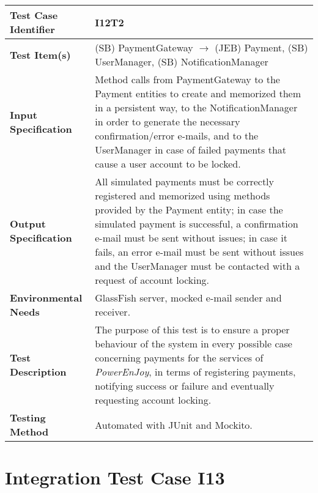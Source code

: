 \begin{longtable}{p{} | p{}}
\hline
\textbf{Test Case Identifier} & I12T2\\
\hline
\textbf{Test Item(s)} & (SB) PaymentGateway $\rightarrow$ (JEB) Payment, (SB) UserManager, (SB) NotificationManager \\
\hline
\textbf{Input Specification} & Method calls from PaymentGateway to the Payment entities to create and memorized them in a persistent way, to the NotificationManager in order to generate the necessary confirmation/error e-mails, and to the UserManager in case of failed payments that cause a user account to be locked. \\
\hline
\textbf{Output Specification} & All simulated payments must be correctly registered and memorized using methods provided by the Payment entity; in case the simulated payment is successful, a confirmation e-mail must be sent without issues; in case it fails, an error e-mail must be sent without issues and the UserManager must be contacted with a request of account locking. \\
\hline
\textbf{Environmental Needs} & GlassFish server, mocked e-mail sender and receiver. \\
\hline
\textbf{Test Description} & The purpose of this test is to ensure a proper behaviour of the system in every possible case concerning payments for the services of \textit{PowerEnJoy}, in terms of registering payments, notifying success or failure and eventually requesting account locking. \\
\hline
\textbf{Testing Method} & Automated with JUnit and Mockito. \\
\hline
\end{longtable}

\section{Integration Test Case I13}

